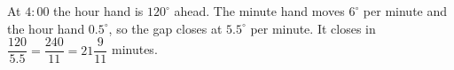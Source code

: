 At $4{:}00$ the hour hand is $120^\circ$ ahead. The minute hand moves $6^\circ$ per minute and the hour hand $0.5^\circ$, so the gap closes at $5.5^\circ$ per minute. It closes in $\dfrac{120}{5.5}=\boxed{\dfrac{240}{11}}=21\dfrac{9}{11}$ minutes.
